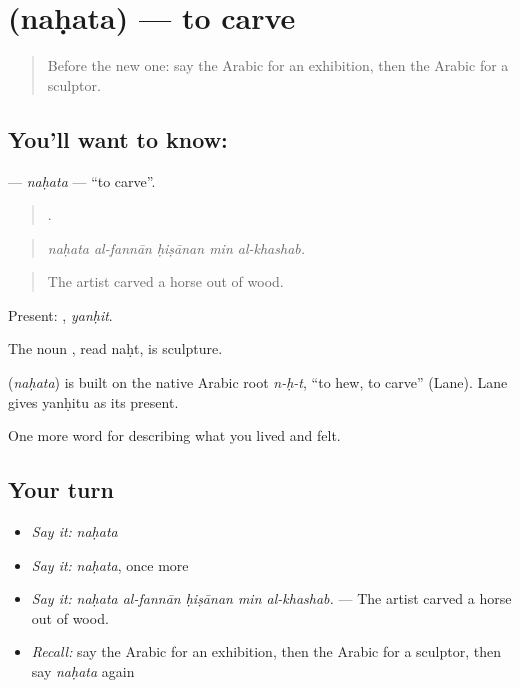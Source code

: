 \section[\texorpdfstring{\ar{نحت} (naḥata)}{نحت (naḥata)}]{ (naḥata) — to carve}

\label{lesson:AR-C541-nahata}



\begin{quote}
Before the new one: say the Arabic for an exhibition, then the Arabic for a sculptor.
\end{quote}

\subsection*{You'll want to know: }
\textbf{} — \emph{naḥata} — \textquotedblleft{}to carve\textquotedblright{}.

\begin{quote}
    .
\end{quote}

\begin{quote}
\emph{naḥata al-fannān ḥiṣānan min al-khashab.}
\end{quote}

\begin{quote}
The artist carved a horse out of wood.
\end{quote}

Present: , \emph{yanḥit}.

The noun , read naḥt, is sculpture.

\begin{cousinweb}
\textbf{} (\emph{naḥata}) is built on the native Arabic root \emph{n-ḥ-t}, \textquotedblleft{}to hew, to carve\textquotedblright{} (Lane). Lane gives yanḥitu as its present.
\end{cousinweb}

\begin{grammarlens}[title={What you've built}]
One more word for describing what you lived and felt.
\end{grammarlens}

\subsection*{Your turn}
\begin{itemize}
\raggedright
  \item \emph{Say it:} \emph{naḥata}
  \item \emph{Say it:} \emph{naḥata}, once more
  \item \emph{Say it:} \emph{naḥata al-fannān ḥiṣānan min al-khashab.} — The artist carved a horse out of wood.
  \item \emph{Recall:} say the Arabic for an exhibition, then the Arabic for a sculptor, then say \emph{naḥata} again
\end{itemize}

